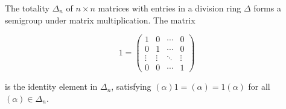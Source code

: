 The totality $\Delta_n$ of $n \times n$ matrices with entries in a division ring $\Delta$ forms a semigroup under matrix multiplication. The matrix

$$1 = \begin{pmatrix}
1 & 0 & \cdots & 0 \\
0 & 1 & \cdots & 0 \\
\vdots & \vdots & \ddots & \vdots \\
0 & 0 & \cdots & 1
\end{pmatrix}$$

is the identity element in $\Delta_n$, satisfying $(\alpha)1 = (\alpha) = 1(\alpha)$ for all $(\alpha) \in \Delta_n$.
